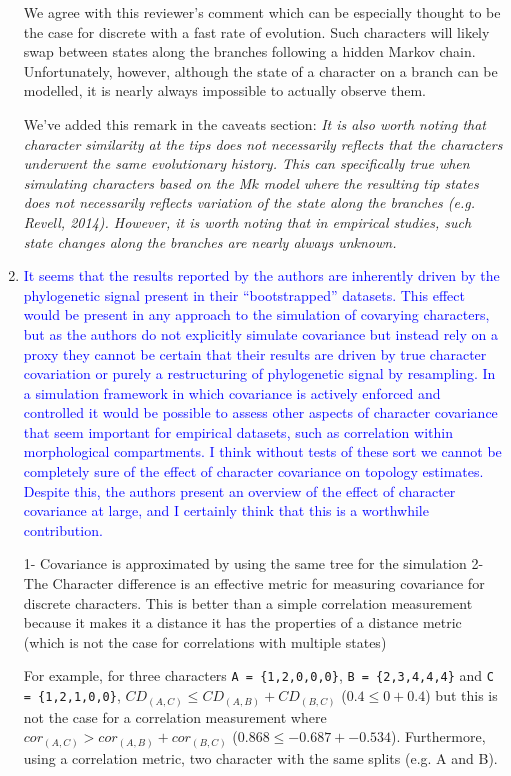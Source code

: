 \documentclass[12pt,letterpaper]{article}
\begin{document}
\begin{enumerate}
We agree with this reviewer's comment which can be especially thought to be the case for discrete with a fast rate of evolution.
Such characters will likely swap between states along the branches following a hidden Markov chain.
Unfortunately, however, although the state of a character on a branch can be modelled, it is nearly always impossible to actually observe them.

We've added this remark in the caveats section:
\textit{It is also worth noting that character similarity at the tips does not necessarily reflects that the characters underwent the same evolutionary history.
This can specifically true when simulating characters based on the M$k$ model where the resulting tip states does not necessarily reflects variation of the state along the branches (e.g. Revell, 2014). However, it is worth noting that in empirical studies, such state changes along the branches are nearly always unknown.}

\item{\textcolor{blue}{It seems that the results reported by the authors are inherently driven by the phylogenetic signal present in their ``bootstrapped'' datasets. This effect would be present in any approach to the simulation of covarying characters, but as the authors do not explicitly simulate covariance but instead rely on a proxy they cannot be certain that their results are driven by true character covariation or purely a restructuring of phylogenetic signal by resampling. In a simulation framework in which covariance is actively enforced and controlled it would be possible to assess other aspects of character covariance that seem important for empirical datasets, such as correlation within morphological compartments. I think without tests of these sort we cannot be completely sure of the effect of character covariance on topology estimates. Despite this, the authors present an overview of the effect of character covariance at large, and I certainly think that this is a worthwhile contribution.}}

1- Covariance is approximated by using the same tree for the simulation
2- The Character difference is an effective metric for measuring covariance for discrete characters. This is better than a simple correlation measurement because it makes it a distance it has the properties of a distance metric (which is not the case for correlations with multiple states)

For example, for three characters \texttt{A = \{1,2,0,0,0\}}, \texttt{B = \{2,3,4,4,4\}} and \texttt{C = \{1,2,1,0,0\}}, $CD_{(A, C)} \leq CD_{(A, B)} + CD_{(B, C)}$ ($0.4 \leq 0 + 0.4$) but this is not the case for a correlation measurement where $cor_{(A, C)} > cor_{(A, B)} + cor_{(B, C)}$ ($0.868 \leq -0.687 + -0.534$). Furthermore, using a correlation metric, two character with the same splits (e.g. A and B).


\end{enumerate}
\end{document}
